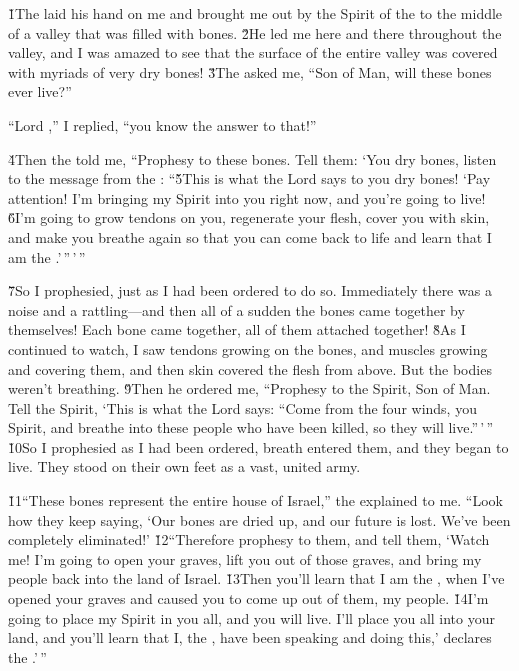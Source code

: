 \v{1}The  laid his hand on me and brought me out by the Spirit of the  to the middle of a valley that was filled with bones. \v{2}He led me here and there throughout the valley, and I was amazed to see that the surface of the entire valley was covered with myriads of very dry bones! \v{3}The  asked me, ``Son of Man, will these bones ever live?''

``Lord ,'' I replied, ``you know the answer to that!''

\v{4}Then the  told me, ``Prophesy to these bones. Tell them: `You dry bones, listen to the message from the : ``\v{5}This is what the Lord  says to you dry bones! `Pay attention! I'm bringing my Spirit into you right now, and you're going to live! \v{6}I'm going to grow tendons on you, regenerate your flesh, cover you with skin, and make you breathe again so that you can come back to life and learn that I am the .'\,''\,'\,''

\v{7}So I prophesied, just as I had been ordered to do so. Immediately there was a noise and a rattling---and then all of a sudden the bones came together by themselves! Each bone came together, all of them attached together! \v{8}As I continued to watch, I saw tendons growing on the bones, and muscles growing and covering them, and then skin covered the flesh from above. But the bodies weren't breathing. \v{9}Then he ordered me, ``Prophesy to the Spirit, Son of Man. Tell the Spirit, `This is what the Lord  says: ``Come from the four winds, you Spirit, and breathe into these people who have been killed, so they will live.''\,'\,'' \v{10}So I prophesied as I had been ordered, breath entered them, and they began to live. They stood on their own feet as a vast, united army.

\v{11}``These bones represent the entire house of Israel,'' the  explained to me. ``Look how they keep saying, `Our bones are dried up, and our future is lost. We've been completely eliminated!' \v{12}``Therefore prophesy to them, and tell them, `Watch me! I'm going to open your graves, lift you out of those graves, and bring my people back into the land of Israel. \v{13}Then you'll learn that I am the , when I've opened your graves and caused you to come up out of them, my people. \v{14}I'm going to place my Spirit in you all, and you will live. I'll place you all into your land, and you'll learn that I, the , have been speaking and doing this,' declares the .'\,''

